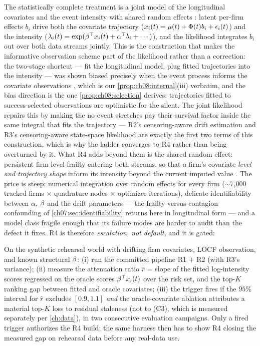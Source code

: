 The statistically complete treatment is a joint model of the
longitudinal covariates and the event intensity with shared random
effects \citep{rizopoulos2012,tsiatisdavidian2004}: latent per-firm
effects $b_i$ drive both the covariate trajectory ($x_i(t) =
\mu(t) + \Phi(t) b_i + \epsilon_i(t)$) and the intensity
($\lambda_i(t) = \exp(\beta^{\top}x_i(t) + \alpha^{\top} b_i + \cdots)$), and the
likelihood integrates $b_i$ out over both data streams jointly. This is
the construction that makes the informative observation scheme part of
the likelihood rather than a correction: the two-stage shortcut --- fit
the longitudinal model, plug fitted trajectories into the intensity ---
was shown biased precisely when the event process informs the covariate
observations \citep{tsiatis1995}, which is our
\cref{prop:ch08:internal}(iii) verbatim, and the bias direction is the
one \cref{prop:ch08:selection} derives: trajectories fitted to
success-selected observations are optimistic for the silent. The joint
likelihood repairs this by making the no-event stretches pay their
survival factor inside the same integral that fits the trajectory ---
R2's censoring-aware drift estimation and R3's censoring-aware
state-space likelihood are exactly the first two terms of this
construction, which is why the ladder converges to R4 rather than being
overturned by it. What R4 adds beyond them is the shared random effect:
persistent firm-level frailty entering both streams, so that a firm's
covariate \emph{level and trajectory shape} inform its intensity beyond
the current imputed value \citep{tsiatisdavidian2004,rizopoulos2012}.
The price is steep: numerical integration over random effects for every
firm ($\sim$7{,}000 tracked firms $\times$ quadrature nodes $\times$
optimizer iterations), delicate identifiability between $\alpha$,
$\beta$ and the drift parameters --- the frailty-versus-contagion
confounding of \cref{ch07:sec:identifiability} returns
here in longitudinal form --- and a model class fragile enough that its
failure modes are harder to audit than the defect it fixes. R4 is
therefore \emph{escalation, not default}, and it is gated:

\begin{protocol}
\label{prot:ch08:gaptest}
On the synthetic rehearsal world with drifting firm covariates, LOCF
observation, and known structural $\beta$: (i) run the committed
pipeline R1 $+$ R2 (with R3's variance); (ii) measure the attenuation
ratio $\hat r$ = slope of the fitted log-intensity scores regressed on
the oracle scores $\beta^{\top}x_i(t)$ over the risk set, and the top-$K$
ranking gap between fitted and oracle covariates; (iii) the trigger
fires if the $95\%$ interval for $\hat r$ excludes $[0.9, 1.1]$ \emph{and}
the oracle-covariate ablation attributes a material top-$K$ loss to
residual staleness (not to (C3), which is measured separately per
\cref{ch:data}), in two consecutive evaluation campaigns. Only a fired
trigger authorizes the R4 build; the same harness then has to show R4
closing the measured gap on rehearsal data before any real-data use.
\end{protocol}

